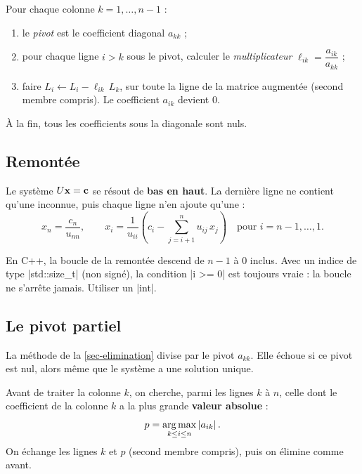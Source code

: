 \begin{methodbox}
Pour chaque colonne $k = 1, \dots, n - 1$ :
\begin{enumerate}
    \item le \emph{pivot} est le coefficient
          diagonal $a_{kk}$ ;
    \item pour chaque ligne $i > k$ sous le pivot,
          calculer le \emph{multiplicateur}
          $\ell_{ik} = \dfrac{a_{ik}}{a_{kk}}$ ;
    \item faire $L_i \leftarrow L_i - \ell_{ik}\, L_k$,
          sur toute la ligne de la matrice augmentée
          (second membre compris). Le coefficient
          $a_{ik}$ devient $0$.
\end{enumerate}
À la fin, tous les coefficients sous la diagonale
sont nuls.
\end{methodbox}

\subsection{Remontée}

\begin{methodbox}
Le système $U\mathbf{x} = \mathbf{c}$ se résout de
\textbf{bas en haut}. La dernière ligne ne contient
qu'une inconnue, puis chaque ligne n'en ajoute
qu'une :
\[
    x_n = \frac{c_n}{u_{nn}},
    \qquad
    x_i = \frac{1}{u_{ii}}
    \left( c_i - \sum_{j = i+1}^{n} u_{ij}\, x_j \right)
    \quad \text{pour } i = n - 1, \dots, 1.
\]
\end{methodbox}

\begin{importantbox}
En C++, la boucle de la remontée descend de $n - 1$
à $0$ inclus. Avec un indice de type
\cpp|std::size_t| (non signé), la condition
\cpp|i >= 0| est toujours vraie : la boucle ne
s'arrête jamais. Utiliser un \cpp|int|.
\end{importantbox}

\subsection{Le pivot partiel}

La méthode de la \cref{sec-elimination} divise par
le pivot $a_{kk}$.
Elle échoue si ce pivot est nul, alors même que le
système a une solution unique.

\begin{definition}
Avant de traiter la colonne $k$, on cherche, parmi les
lignes $k$ à $n$, celle dont le coefficient de la
colonne $k$ a la plus grande \textbf{valeur absolue} :
\[
    p = \operatorname*{arg\,max}_{k \le i \le n} \left|a_{ik}\right|.
\]
On échange les lignes $k$ et $p$ (second membre
compris), puis on élimine comme avant.
\end{definition}

